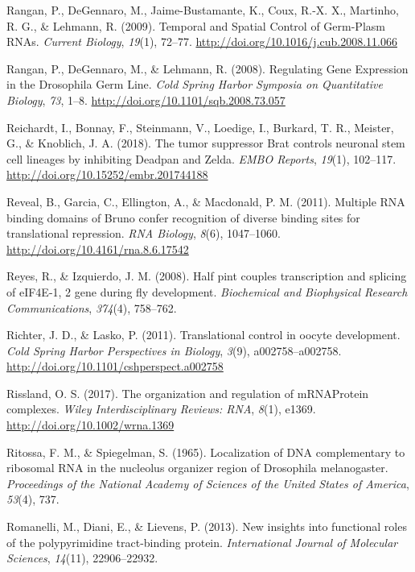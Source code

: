 \documentclass[12pt,oneside]{reedthesis}
\newlength{\cslhangindent}
\newenvironment{cslreferences}%
  {\setlength{\parindent}{0pt}%
  \everypar{\setlength{\hangindent}{\cslhangindent}}\ignorespaces}%
  {\par}
\begin{document}
\begin{cslreferences}
\leavevmode\hypertarget{ref-Rangan2009}{}%
Rangan, P., DeGennaro, M., Jaime-Bustamante, K., Coux, R.-X. X., Martinho, R. G., \& Lehmann, R. (2009). Temporal and Spatial Control of Germ-Plasm RNAs. \emph{Current Biology}, \emph{19}(1), 72--77. \url{http://doi.org/10.1016/j.cub.2008.11.066}

\leavevmode\hypertarget{ref-Rangan2008}{}%
Rangan, P., DeGennaro, M., \& Lehmann, R. (2008). Regulating Gene Expression in the Drosophila Germ Line. \emph{Cold Spring Harbor Symposia on Quantitative Biology}, \emph{73}, 1--8. \url{http://doi.org/10.1101/sqb.2008.73.057}

\leavevmode\hypertarget{ref-Reichardt2018d}{}%
Reichardt, I., Bonnay, F., Steinmann, V., Loedige, I., Burkard, T. R., Meister, G., \& Knoblich, J. A. (2018). The tumor suppressor Brat controls neuronal stem cell lineages by inhibiting Deadpan and Zelda. \emph{EMBO Reports}, \emph{19}(1), 102--117. \url{http://doi.org/10.15252/embr.201744188}

\leavevmode\hypertarget{ref-Reveal2011j}{}%
Reveal, B., Garcia, C., Ellington, A., \& Macdonald, P. M. (2011). Multiple RNA binding domains of Bruno confer recognition of diverse binding sites for translational repression. \emph{RNA Biology}, \emph{8}(6), 1047--1060. \url{http://doi.org/10.4161/rna.8.6.17542}

\leavevmode\hypertarget{ref-Reyes2008}{}%
Reyes, R., \& Izquierdo, J. M. (2008). Half pint couples transcription and splicing of eIF4E-1, 2 gene during fly development. \emph{Biochemical and Biophysical Research Communications}, \emph{374}(4), 758--762.

\leavevmode\hypertarget{ref-Richter2011j}{}%
Richter, J. D., \& Lasko, P. (2011). Translational control in oocyte development. \emph{Cold Spring Harbor Perspectives in Biology}, \emph{3}(9), a002758--a002758. \url{http://doi.org/10.1101/cshperspect.a002758}

\leavevmode\hypertarget{ref-Rissland2017k}{}%
Rissland, O. S. (2017). The organization and regulation of mRNAProtein complexes. \emph{Wiley Interdisciplinary Reviews: RNA}, \emph{8}(1), e1369. \url{http://doi.org/10.1002/wrna.1369}

\leavevmode\hypertarget{ref-Ritossa1965a}{}%
Ritossa, F. M., \& Spiegelman, S. (1965). Localization of DNA complementary to ribosomal RNA in the nucleolus organizer region of Drosophila melanogaster. \emph{Proceedings of the National Academy of Sciences of the United States of America}, \emph{53}(4), 737.

\leavevmode\hypertarget{ref-Romanelli2013}{}%
Romanelli, M., Diani, E., \& Lievens, P. (2013). New insights into functional roles of the polypyrimidine tract-binding protein. \emph{International Journal of Molecular Sciences}, \emph{14}(11), 22906--22932.


\end{cslreferences}
\end{document}
